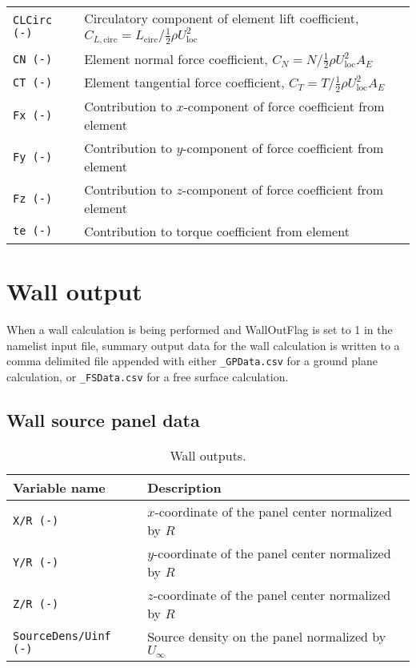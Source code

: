 \begin{table}[!htbp]
\begin{tabular}{p{}p{}}
\texttt{CLCirc (-)}          & Circulatory component of element lift coefficient, $C_{L,\textrm{circ}}={L_\textrm{circ}}/{\frac{1}{2} \rho U_\textrm{loc}^2}$ \\
\texttt{CN (-)}              & Element normal force coefficient, $C_N = {N}/{\frac{1}{2} \rho U_\textrm{loc}^2 A_E}$ \\ 
\texttt{CT (-)}              & Element tangential force coefficient, $C_T = {T}/{\frac{1}{2} \rho U_\textrm{loc}^2 A_E}$ \\
\texttt{Fx (-)}              & Contribution to $x$-component of force coefficient from element \\
\texttt{Fy (-)}              & Contribution to $y$-component of force coefficient from element \\
\texttt{Fz (-)}              & Contribution to $z$-component of force coefficient from element \\
\texttt{te (-)}              & Contribution to torque coefficient from element \\
\bottomrule
\end{tabular}
\end{table}

\section{Wall output}
When a wall calculation is being performed and WallOutFlag is set to 1 in the namelist input file, summary output data for the wall calculation is written to a comma delimited file appended with either \texttt{\_GPData.csv} for a ground plane calculation, or \texttt{\_FSData.csv} for a free surface calculation.

\subsection{Wall source panel data}
\begin{table}[!htbp]
\centering
\caption{Wall outputs.}
\label{tbl:output_wall}
\begin{tabular}{p{}p{}}
\toprule
Variable name & Description \\ \midrule
\texttt{X/R (-)}             & $x$-coordinate of the panel center normalized by $R$ \\
\texttt{Y/R (-)}             & $y$-coordinate of the panel center normalized by $R$ \\
\texttt{Z/R (-)}             & $z$-coordinate of the panel center normalized by $R$ \\
\texttt{SourceDens/Uinf (-)} & Source density on the panel normalized by $U_\infty$ \\
\bottomrule
\end{tabular}
\end{table}

